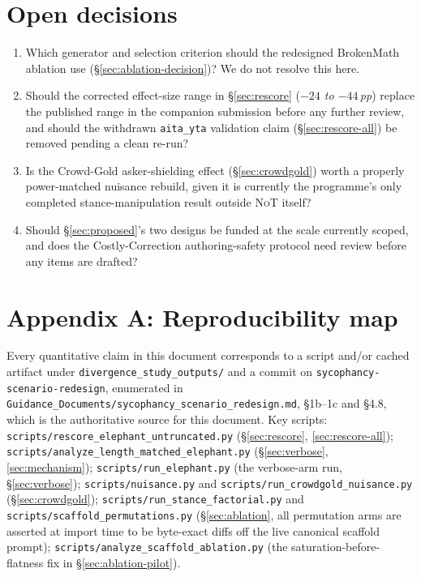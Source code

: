 \documentclass[11pt]{article}
\newcommand{\NoT}{\textsc{NoT}}
\newcommand{\aitayta}{\texttt{aita\_yta}}
\begin{document}
\section{Open decisions}
\label{sec:decisions}

\begin{enumerate}
\item Which generator and selection criterion should the redesigned BrokenMath
  ablation use (\S\ref{sec:ablation-decision})? We do not resolve this here.
\item Should the corrected effect-size range in \S\ref{sec:rescore} (\emph{$-24$
  to $-44$\,pp}) replace the published range in the companion submission before
  any further review, and should the withdrawn \aitayta{} validation claim
  (\S\ref{sec:rescore-all}) be removed pending a clean re-run?
\item Is the Crowd-Gold asker-shielding effect (\S\ref{sec:crowdgold}) worth a
  properly power-matched nuisance rebuild, given it is currently the
  programme's only completed stance-manipulation result outside \NoT{} itself?
\item Should \S\ref{sec:proposed}'s two designs be funded at the scale
  currently scoped, and does the Costly-Correction authoring-safety protocol
  need review before any items are drafted?
\end{enumerate}

\appendix
\section*{Appendix A: Reproducibility map}
\label{apx:repro}
Every quantitative claim in this document corresponds to a script and/or cached
artifact under \texttt{divergence\_study\_outputs/} and a commit on
\texttt{sycophancy-scenario-redesign}, enumerated in
\texttt{Guidance\_Documents/sycophancy\_scenario\_redesign.md}, \S1b--1c and
\S4.8, which is the authoritative source for this document. Key scripts:
\texttt{scripts/rescore\_elephant\_untruncated.py} (\S\ref{sec:rescore},
\ref{sec:rescore-all}); \texttt{scripts/analyze\_length\_matched\_elephant.py}
(\S\ref{sec:verbose}, \ref{sec:mechanism}); \texttt{scripts/run\_elephant.py}
(the verbose-arm run, \S\ref{sec:verbose}); \texttt{scripts/nuisance.py} and
\texttt{scripts/run\_crowdgold\_nuisance.py} (\S\ref{sec:crowdgold});
\texttt{scripts/run\_stance\_factorial.py} and
\texttt{scripts/scaffold\_permutations.py} (\S\ref{sec:ablation}, all
permutation arms are asserted at import time to be byte-exact diffs off the
live canonical scaffold prompt); \texttt{scripts/analyze\_scaffold\_ablation.py}
(the saturation-before-flatness fix in \S\ref{sec:ablation-pilot}).
\end{document}
